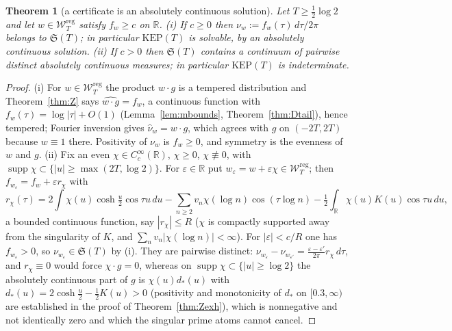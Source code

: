 \documentclass[11pt]{amsart}
\newtheorem{theorem}{Theorem}[section]
\theoremstyle{definition}
\theoremstyle{remark}
\newcommand{\R}{\mathbb R}
\newcommand{\supp}{\operatorname{supp}}
\newcommand{\nuh}{\widehat\nu}
\newcommand{\Wcl}{\mathcal W_T}
\begin{document}
\begin{theorem}[a certificate is an absolutely continuous solution]\label{thm:KEP1}
Let $T\ge\frac12\log2$ and let $w\in\Wcl^{\mathrm{reg}}$ satisfy $f_w\ge c$ on $\R$.
\emph{(i)} If $c\ge0$ then $\nu_w:=f_w(\tau)\,d\tau/2\pi$ belongs to $\mathfrak S(T)$; in particular
$\mathrm{KEP}(T)$ is solvable, by an absolutely continuous solution.
\emph{(ii)} If $c>0$ then $\mathfrak S(T)$ contains a continuum of pairwise distinct absolutely
continuous measures; in particular $\mathrm{KEP}(T)$ is indeterminate.
\end{theorem}
\begin{proof}
(i) For $w\in\Wcl^{\mathrm{reg}}$ the product $w\cdot g$ is a tempered distribution and
Theorem~\ref{thm:Z} says $\widehat{w\cdot g}=f_w$, a continuous function with
$f_w(\tau)=\log|\tau|+O(1)$ (Lemma~\ref{lem:mbounds}, Theorem~\ref{thm:Dtail}), hence tempered;
Fourier inversion gives $\nuh_w=w\cdot g$, which agrees with $g$ on $(-2T,2T)$ because $w\equiv1$
there. Positivity of $\nu_w$ is $f_w\ge0$, and symmetry is the evenness of $w$ and $g$.
(ii) Fix an even $\chi\in C_c^\infty(\R)$, $\chi\ge0$, $\chi\not\equiv0$, with
$\supp\chi\subset\{|u|\ge\max(2T,\log2)\}$. For $\varepsilon\in\R$ put $w_\varepsilon=w+\varepsilon\chi
\in\Wcl^{\mathrm{reg}}$; then $f_{w_\varepsilon}=f_w+\varepsilon r_\chi$ with
\[
r_\chi(\tau)=2\int\chi(u)\cosh\tfrac u2\cos\tau u\,du-\sum_{n\ge2}v_n\chi(\log n)\cos(\tau\log n)
-\tfrac12\int_\R\chi(u)K(u)\cos\tau u\,du ,
\]
a bounded continuous function, say $|r_\chi|\le R$ ($\chi$ is compactly supported away from the
singularity of $K$, and $\sum_nv_n|\chi(\log n)|<\infty$). For $|\varepsilon|<c/R$ one has
$f_{w_\varepsilon}>0$, so $\nu_{w_\varepsilon}\in\mathfrak S(T)$ by (i). They are pairwise distinct:
$\nu_{w_\varepsilon}-\nu_{w_{\varepsilon'}}=\frac{\varepsilon-\varepsilon'}{2\pi}r_\chi\,d\tau$, and
$r_\chi\equiv0$ would force $\chi\cdot g=0$, whereas on $\supp\chi\subset\{|u|\ge\log2\}$ the
absolutely continuous part of $g$ is $\chi(u)d_*(u)$ with $d_*(u)=2\cosh\frac u2-\frac12K(u)>0$
(positivity and monotonicity of $d_*$ on $[0.3,\infty)$ are established in the proof of
Theorem~\ref{thm:Zexh}), which is nonnegative and not identically zero and which the singular prime
atoms cannot cancel.
\end{proof}
\end{document}

